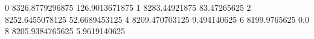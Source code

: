 0 8326.8779296875 126.9013671875
1 8283.44921875 83.47265625
2 8252.6455078125 52.6689453125
4 8209.470703125 9.494140625
6 8199.9765625 0.0
8 8205.9384765625 5.9619140625
